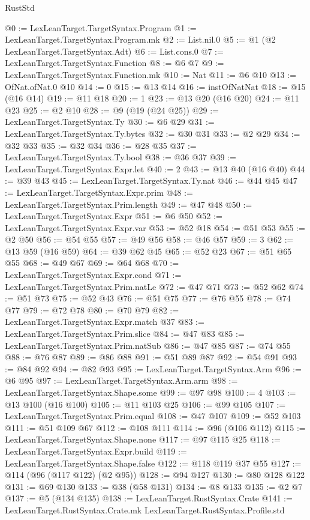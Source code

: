 \begin{lexlean}{RustStd}
\begin{coremodule}
@0 := LexLeanTarget.TargetSyntax.Program
@1 := LexLeanTarget.TargetSyntax.Program.mk
@2 := List.nil.{0}
@5 := @1 (@2 LexLeanTarget.TargetSyntax.Adt)
@6 := List.cons.{0}
@7 := LexLeanTarget.TargetSyntax.Function
@8 := @6 @7
@9 := LexLeanTarget.TargetSyntax.Function.mk
@10 := Nat
@11 := @6 @10
@13 := OfNat.ofNat.{0} @10
@14 := 0
@15 := @13 @14
@16 := instOfNatNat
@18 := @15 (@16 @14)
@19 := @11 @18
@20 := 1
@23 := @13 @20 (@16 @20)
@24 := @11 @23
@25 := @2 @10
@28 := @9 (@19 (@24 @25))
@29 := LexLeanTarget.TargetSyntax.Ty
@30 := @6 @29
@31 := LexLeanTarget.TargetSyntax.Ty.bytes
@32 := @30 @31
@33 := @2 @29
@34 := @32 @33
@35 := @32 @34
@36 := @28 @35
@37 := LexLeanTarget.TargetSyntax.Ty.bool
@38 := @36 @37
@39 := LexLeanTarget.TargetSyntax.Expr.let
@40 := 2
@43 := @13 @40 (@16 @40)
@44 := @39 @43
@45 := LexLeanTarget.TargetSyntax.Ty.nat
@46 := @44 @45
@47 := LexLeanTarget.TargetSyntax.Expr.prim
@48 := LexLeanTarget.TargetSyntax.Prim.length
@49 := @47 @48
@50 := LexLeanTarget.TargetSyntax.Expr
@51 := @6 @50
@52 := LexLeanTarget.TargetSyntax.Expr.var
@53 := @52 @18
@54 := @51 @53
@55 := @2 @50
@56 := @54 @55
@57 := @49 @56
@58 := @46 @57
@59 := 3
@62 := @13 @59 (@16 @59)
@64 := @39 @62 @45
@65 := @52 @23
@67 := @51 @65 @55
@68 := @49 @67
@69 := @64 @68
@70 := LexLeanTarget.TargetSyntax.Expr.cond
@71 := LexLeanTarget.TargetSyntax.Prim.natLe
@72 := @47 @71
@73 := @52 @62
@74 := @51 @73
@75 := @52 @43
@76 := @51 @75
@77 := @76 @55
@78 := @74 @77
@79 := @72 @78
@80 := @70 @79
@82 := LexLeanTarget.TargetSyntax.Expr.match @37
@83 := LexLeanTarget.TargetSyntax.Prim.slice
@84 := @47 @83
@85 := LexLeanTarget.TargetSyntax.Prim.natSub
@86 := @47 @85
@87 := @74 @55
@88 := @76 @87
@89 := @86 @88
@91 := @51 @89 @87
@92 := @54 @91
@93 := @84 @92
@94 := @82 @93
@95 := LexLeanTarget.TargetSyntax.Arm
@96 := @6 @95
@97 := LexLeanTarget.TargetSyntax.Arm.arm
@98 := LexLeanTarget.TargetSyntax.Shape.some
@99 := @97 @98
@100 := 4
@103 := @13 @100 (@16 @100)
@105 := @11 @103 @25
@106 := @99 @105
@107 := LexLeanTarget.TargetSyntax.Prim.equal
@108 := @47 @107
@109 := @52 @103
@111 := @51 @109 @67
@112 := @108 @111
@114 := @96 (@106 @112)
@115 := LexLeanTarget.TargetSyntax.Shape.none
@117 := @97 @115 @25
@118 := LexLeanTarget.TargetSyntax.Expr.build
@119 := LexLeanTarget.TargetSyntax.Shape.false
@122 := @118 @119 @37 @55
@127 := @114 (@96 (@117 @122) (@2 @95))
@128 := @94 @127
@130 := @80 @128 @122
@131 := @69 @130
@133 := @38 (@58 @131)
@134 := @8 @133
@135 := @2 @7
@137 := @5 (@134 @135)
@138 := LexLeanTarget.RustSyntax.Crate
@141 := LexLeanTarget.RustSyntax.Crate.mk LexLeanTarget.RustSyntax.Profile.std

\end{coremodule}
\end{lexlean}
